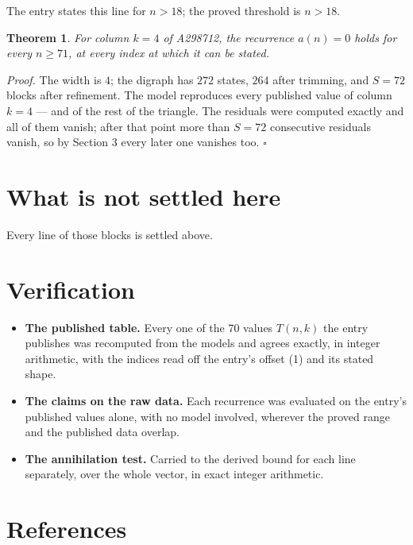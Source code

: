 \documentclass[11pt]{article}
\newtheorem{theorem}{Theorem}
\theoremstyle{definition}
\begin{document}
The entry states this line for $n > 18$; the proved threshold is $n > 18$.

\begin{theorem} For column $k = 4$ of A298712, the recurrence $a(n) = 0$ holds for every $n \ge 71$, at every index at which it can be stated.\end{theorem}

{\itshape Proof.} The width is $4$; the digraph has $272$ states, $264$ after trimming, and $S = 72$ blocks after refinement. The model reproduces every published value of column $k = 4$ --- and of the rest of the triangle. The residuals were computed exactly and all of them vanish; after that point more than $S = 72$ consecutive residuals vanish, so by Section 3 every later one vanishes too. $\square$

\section{What is not settled here}

Every line of those blocks is settled above.

\section{Verification}

\begin{itemize}

\item {\bfseries The published table.} Every one of the 70 values $T(n,k)$ the entry publishes was recomputed from the models and agrees exactly, in integer arithmetic, with the indices read off the entry's offset (1) and its stated shape.

\item {\bfseries The claims on the raw data.} Each recurrence was evaluated on the entry's published values alone, with no model involved, wherever the proved range and the published data overlap.

\item {\bfseries The annihilation test.} Carried to the derived bound for each line separately, over the whole vector, in exact integer arithmetic.

\end{itemize}

\section{References}
\end{document}
